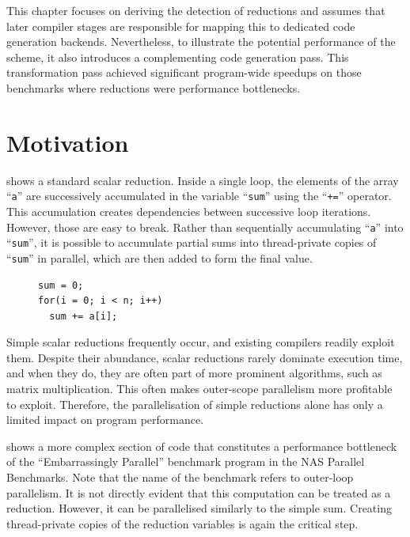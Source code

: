     This chapter focuses on deriving the detection of reductions and assumes
    that later compiler stages are responsible for mapping this to dedicated
    code generation backends.
    Nevertheless, to illustrate the potential performance of the scheme, it also
    introduces a complementing code generation pass.
    This transformation pass achieved significant program-wide speedups on those
    benchmarks where reductions were performance bottlenecks.

\section{Motivation}

     shows a standard scalar reduction.
    Inside a single loop, the elements of the array ``{\tt a}'' are
    successively accumulated in the variable ``{\tt sum}'' using the
    ``{\tt +=}'' operator.
    This accumulation creates dependencies between successive loop iterations.
    However, those are easy to break.
    Rather than sequentially accumulating ``{\tt a}'' into ``{\tt sum}'', it is
    possible to accumulate partial sums into thread-private copies of
    ``{\tt sum}'' in parallel, which are then added to form the final value.

\begin{figure}[h]
\begin{lstlisting}[language=MyCpp, label={sum-figure}, caption=
    {The most conventional example of a reduction is the adding up of values
     in an array:
     The reduction operator ``{\tt+}'' {\it reduces} the array ``{\tt a}'' to
     a single value -- the reduction variable ``{\tt sum}''.}]
sum = 0;
for(i = 0; i < n; i++)
  sum += a[i];
\end{lstlisting}
\end{figure}

    Simple scalar reductions frequently occur, and existing compilers readily
    exploit them.
    Despite their abundance, scalar reductions rarely dominate execution time,
    and when they do, they are often part of more prominent algorithms, such as
    matrix multiplication.
    This often makes outer-scope parallelism more profitable to exploit.
    Therefore, the parallelisation of simple reductions alone has only a
    limited impact on program performance.

     shows a more complex section of code that
    constitutes a performance bottleneck of the ``Embarrassingly Parallel''
    benchmark program in the NAS Parallel Benchmarks.
    Note that the name of the benchmark refers to outer-loop parallelism.
    It is not directly evident that this computation can be treated as a
    reduction.
    However, it can be parallelised similarly to the simple sum.
    Creating thread-private copies of the reduction variables is again the
    critical step.

